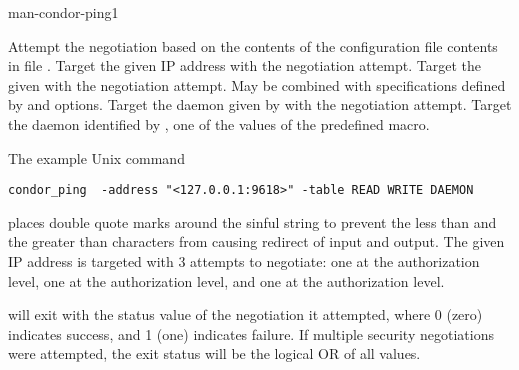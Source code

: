\begin{ManPage}{}{man-condor-ping}{1}
\begin{Options}
  \ToolArgsBaseDesc
    {Attempt the negotiation based on the contents of the configuration file
    contents in file .  }
    {Target the given IP address with the negotiation attempt.  }
    {Target the given  with the negotiation attempt. 
    May be combined with specifications defined by  
    and  options. }
    {Target the daemon given by  with the negotiation attempt. 
    }
    {Target the daemon identified by , 
    one of the values of the predefined  macro. }
\end{Options}

\Examples

The example Unix command
\begin{verbatim}
condor_ping  -address "<127.0.0.1:9618>" -table READ WRITE DAEMON
\end{verbatim}
places double quote marks around the sinful string to prevent the
less than and the greater than characters from causing redirect of
input and output.
The given IP address is targeted with 3 attempts to negotiate:
one at the  authorization level, 
one at the  authorization level, 
and one at the  authorization level.

\ExitStatus

 will exit with the status value of the negotiation
it attempted,
where 0 (zero) indicates success, and 1 (one) indicates failure.
If multiple security negotiations were attempted, 
the exit status will be the logical OR of all values.

\end{ManPage}
